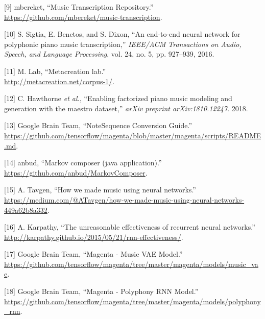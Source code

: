 \documentclass[12pt,]{article}
\begin{document}
\leavevmode\hypertarget{ref-mbereket}{}%
{[}9{]} \relax mbereket, ``Music Transcription Repository.'' \\
\url{https://github.com/mbereket/music-transcription}.

\leavevmode\hypertarget{ref-sigtia2016end}{}%
{[}10{]} S. Sigtia, E. Benetos, and S. Dixon, ``An end-to-end neural
network for polyphonic piano music transcription,'' \emph{IEEE/ACM
Transactions on Audio, Speech, and Language Processing}, vol. 24, no. 5,
pp. 927--939, 2016.

\leavevmode\hypertarget{ref-metacreation}{}%
{[}11{]} M. Lab, ``Metacreation lab.'' \\
\url{http://metacreation.net/corpus-1/}.

\leavevmode\hypertarget{ref-maestro2018}{}%
{[}12{]} C. Hawthorne \emph{et al.}, ``Enabling factorized piano music
modeling and generation with the maestro dataset,'' \emph{arXiv preprint
arXiv:1810.12247}. 2018.

\leavevmode\hypertarget{ref-notesequences}{}%
{[}13{]} \relax Google Brain Team, ``NoteSequence Conversion Guide.'' \\
\url{https://github.com/tensorflow/magenta/blob/master/magenta/scripts/README.md}.

\leavevmode\hypertarget{ref-markovcomposer}{}%
{[}14{]} \relax anbud, ``Markov composer (java application).'' \\
\url{https://github.com/anbud/MarkovComposer}.

\leavevmode\hypertarget{ref-alextavgen}{}%
{[}15{]} A. Tavgen, ``How we made music using neural networks.'' \\
\url{https://medium.com/@ATavgen/how-we-made-music-using-neural-networks-449a62b8a332}.

\leavevmode\hypertarget{ref-karpathy}{}%
{[}16{]} A. Karpathy, ``The unreasonable effectiveness of recurrent
neural networks.'' \\
\url{http://karpathy.github.io/2015/05/21/rnn-effectiveness/}.

\leavevmode\hypertarget{ref-magentavae}{}%
{[}17{]} \relax Google Brain Team, ``Magenta - Music VAE Model.'' \\
\url{https://github.com/tensorflow/magenta/tree/master/magenta/models/music_vae}.

\leavevmode\hypertarget{ref-magentapolyphony}{}%
{[}18{]} \relax Google Brain Team, ``Magenta - Polyphony RNN Model.'' \\
\url{https://github.com/tensorflow/magenta/tree/master/magenta/models/polyphony_rnn}.
\end{document}
